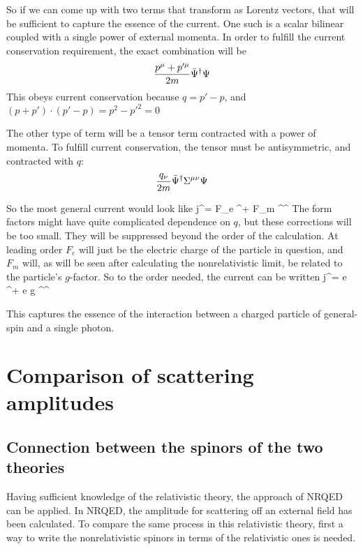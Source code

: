 So if we can come up with two terms that transform as Lorentz vectors, that will be sufficient to capture the essence of the current.  One such is a scalar bilinear coupled with a single power of external momenta.  In order to fulfill the current conservation requirement, the exact combination will be
\[
	\frac{p^\mu + p'^\mu}{2m} \bar{\Psi}^\dagger \Psi
\]
This obeys current conservation because $q = p' -p$, and $ (p+p')\cdot(p'-p) = p^2-p'^2=0$

The other type of term will be a tensor term contracted with a power of momenta.  To fulfill current conservation, the tensor must be antisymmetric, and contracted with $q$:
\[
	\frac{q_\nu}{2m} \bar{\Psi}^\dagger \Sigma^{\mu\nu} \Psi
\]

So the most general current would look like
\beq \label{eq:khr_current}
	j^\mu = F_e  \Psigbar^\dagger \Psig + F_m 	 \Psigbar^\dagger \TensBi^{\mu\nu} \Psig	
\eeq
The form factors might have quite complicated dependence on $q$, but these corrections will be too small.  They will be suppressed beyond the order of the calculation.  At leading order $F_e$ will just be the electric charge of the particle in question, and $F_m$ will, as will be seen after calculating the nonrelativistic limit, be related to the particle's $g$-factor.  So to the order needed, the current can be written
\beq 
	j^\mu =  e  \Psigbar^\dagger \Psig +   e g  \Psigbar^\dagger \TensBi^{\mu\nu} \Psig
\eeq


This captures the essence of the interaction between a charged particle of general-spin and a single photon.


\section{Comparison of scattering amplitudes}

\subsection{Connection between the spinors of the two theories}
Having sufficient knowledge of the relativistic theory, the approach of NRQED can be applied.  In NRQED, the amplitude for scattering off an external field has been calculated.  To compare the same process in this relativistic theory, first a way to write the nonrelativistic spinors in terms of the relativistic ones is needed.

